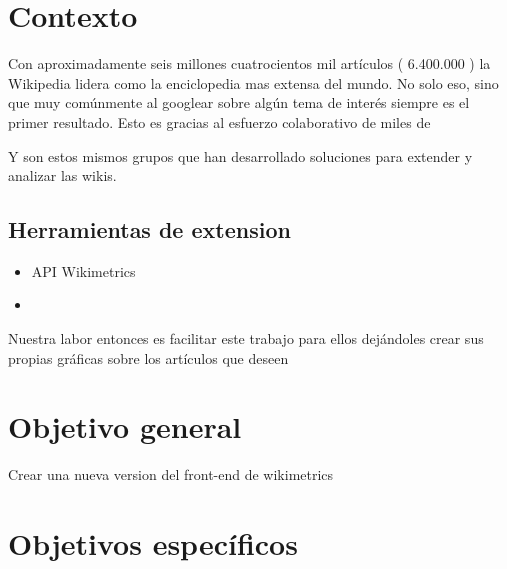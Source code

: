
\section{Contexto}



Con aproximadamente seis millones cuatrocientos mil artículos ( 6.400.000 ) la Wikipedia lidera como la enciclopedia mas extensa del mundo. No solo eso, sino que muy comúnmente al googlear sobre algún tema de interés siempre es el primer resultado.
Esto es gracias al esfuerzo colaborativo de miles de 





Y son estos mismos grupos que han desarrollado soluciones para extender y analizar las wikis.


\subsection*{Herramientas de extension }
\begin{itemize}
    \item API Wikimetrics
    \item
\end{itemize}


Nuestra labor entonces es facilitar este trabajo para ellos dejándoles crear sus propias gráficas sobre los artículos que deseen

\section{Objetivo general}
Crear una nueva version del front-end de wikimetrics


\section{Objetivos específicos}

